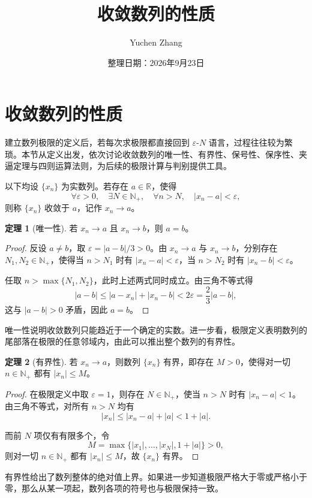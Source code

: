 \documentclass[UTF8, fontset=fandol, a4paper, 12pt]{ctexart}
\title{收敛数列的性质}
\author{Yuchen Zhang}
\date{整理日期：2026年9月23日}
\makeatletter
\newcommand{\R}{\mathbb R}
\newcommand{\Nplus}{\mathbb N_{+}}
\theoremstyle{definition}
\newtheorem{theorem}{定理}
\renewcommand{\maketitle}{\begin{center}
{\LARGE\bfseries \@title\par}\vspace{0.6em}
\@author\par\vspace{0.2em}{\small\@date\par}
\end{center}}
\makeatother
\begin{document}
\maketitle
\setcounter{section}{1}
\setcounter{theorem}{1}
\section{收敛数列的性质}

建立数列极限的定义后，若每次求极限都直接回到 $\varepsilon$-$N$ 语言，过程往往较为繁琐。本节从定义出发，依次讨论收敛数列的唯一性、有界性、保号性、保序性、夹逼定理与四则运算法则，为后续的极限计算与判别提供工具。

以下均设 $\{x_n\}$ 为实数列。若存在 $a\in\R$，使得
\[
  \forall\varepsilon>0,\quad \exists N\in\Nplus,\quad
  \forall n>N,\quad |x_n-a|<\varepsilon,
\]
则称 $\{x_n\}$ 收敛于 $a$，记作 $x_n\to a$。

\begin{theorem}[唯一性]
若 $x_n\to a$ 且 $x_n\to b$，则 $a=b$。
\end{theorem}
\begin{proof}
反设 $a\ne b$，取 $\varepsilon=|a-b|/3>0$。由 $x_n\to a$ 与 $x_n\to b$，分别存在 $N_1,N_2\in\Nplus$，使得当 $n>N_1$ 时有 $|x_n-a|<\varepsilon$，当 $n>N_2$ 时有 $|x_n-b|<\varepsilon$。

任取 $n>\max\{N_1,N_2\}$，此时上述两式同时成立。由三角不等式得
\[
 |a-b|\le |a-x_n|+|x_n-b|<2\varepsilon
 =\frac23|a-b|,
\]
这与 $|a-b|>0$ 矛盾，因此 $a=b$。
\end{proof}

唯一性说明收敛数列只能趋近于一个确定的实数。进一步看，极限定义表明数列的尾部落在极限的任意邻域内，由此可以推出整个数列的有界性。

\begin{theorem}[有界性]
若 $x_n\to a$，则数列 $\{x_n\}$ 有界，即存在 $M>0$，使得对一切
$n\in\Nplus$ 都有 $|x_n|\le M$。
\end{theorem}
\begin{proof}
在极限定义中取 $\varepsilon=1$，则存在 $N\in\Nplus$，使当 $n>N$ 时有 $|x_n-a|<1$。由三角不等式，对所有 $n>N$ 均有
\[
 |x_n|\le |x_n-a|+|a|<1+|a|.
\]

而前 $N$ 项仅有有限多个，令
\[
 M=\max\bigl\{|x_1|,\ldots,|x_N|,1+|a|\bigr\}>0,
\]
则对一切 $n\in\Nplus$ 都有 $|x_n|\le M$，故 $\{x_n\}$ 有界。
\end{proof}

有界性给出了数列整体的绝对值上界。如果进一步知道极限严格大于零或严格小于零，那么从某一项起，数列各项的符号也与极限保持一致。
\end{document}
